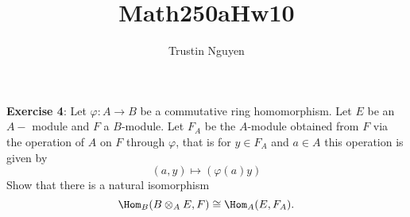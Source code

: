 \documentclass{article}
\title{Math250aHw10}
\author{Trustin Nguyen}
\begin{document}
    \maketitle

\reversemarginpar

\textbf{Exercise 4}: Let $\varphi : A \rightarrow B$ be a commutative ring homomorphism. Let $E$ be an $A-$ module and $F$ a $B$-module. Let $F_{A}$ be the $A$-module obtained from $F$ via the operation of $A$ on $F$ through $\varphi$, that is for $y \in F_{A}$ and $a \in A$ this operation is given by 
    \begin{equation*}
        (a, y)\mapsto (\varphi (a)y)
    \end{equation*}
Show that there is a natural isomorphism
    \begin{equation*}
        \Hom_{B}(B  \otimes_{A} E, F) \cong \Hom_{A}(E, F_{A}).
    \end{equation*} 
\end{document}

